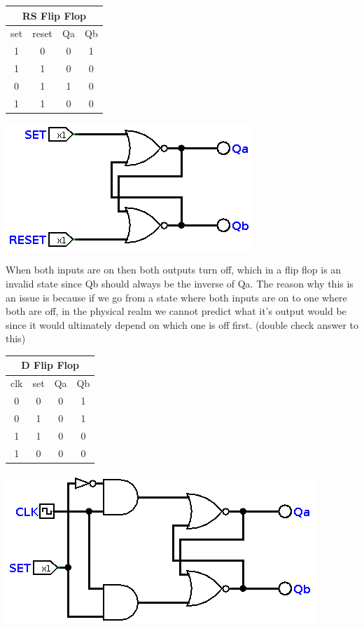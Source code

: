 \documentclass[11pt]{scrartcl}
\begin{document}
\pagebreak

\begin{center}
    \begin{tabular}{c c|c c}
        \multicolumn{4}{c}{RS Flip Flop} \\
        \hline
        set & reset & Qa & Qb \\
        1 & 0 & 0 & 1 \\
        1 & 1 & 0 & 0 \\
        0 & 1 & 1 & 0 \\
        1 & 1 & 0 & 0 \\
    \end{tabular}

    \includegraphics[scale=0.6]{images/rsflipflop.png}
\end{center}

When both inputs are on then both outputs turn off, which in a flip flop is an invalid state since Qb should always be the inverse of Qa.
The reason why this is an issue is because if we go from a state where both inputs are on to one where both are off, in the physical
realm we cannot predict what it's output would be since it would ultimately depend on which one is off first.
{\color{red}(double check answer to this)}

\begin{center}
    \begin{tabular}{c c|c c}
        \multicolumn{4}{c}{D Flip Flop} \\
        \hline
        clk & set & Qa & Qb \\
        0 & 0 & 0 & 1 \\
        0 & 1 & 0 & 1 \\
        1 & 1 & 0 & 0 \\
        1 & 0 & 0 & 0 \\
    \end{tabular}

    \includegraphics[scale=0.6]{images/dflipflop.png}
\end{center}
\end{document}
